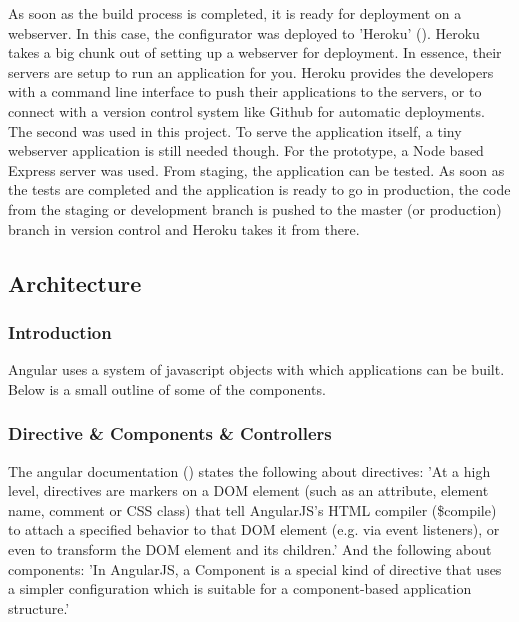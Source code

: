 As soon as the build process is completed, it is ready for deployment on a webserver. In this case, the configurator was deployed to 'Heroku' (\cite{heroku}). Heroku takes a big chunk out of setting up a webserver for deployment. In essence, their servers are setup to run an application for you. Heroku provides the developers with a command line interface to push their applications to the servers, or to connect with a version control system like Github for automatic deployments. The second was used in this project. To serve the application itself, a tiny webserver application is still needed though. For the prototype, a Node based Express server was used.\newline
From staging, the application can be tested. As soon as the tests are completed and the application is ready to go in production, the code from the staging or development branch is pushed to the master (or production) branch in version control and Heroku takes it from there.

\subsection{Architecture}
\subsubsection{Introduction}
Angular uses a system of javascript objects with which applications can be built. Below is a small outline of some of the components.\newline
\subsubsection{Directive \& Components \& Controllers}
The angular documentation (\cite{angularConcepts}) states the following about directives: \newline
'At a high level, directives are markers on a DOM element (such as an attribute, element name, comment or CSS class) that tell AngularJS's HTML compiler (\$compile) to attach a specified behavior to that DOM element (e.g. via event listeners), or even to transform the DOM element and its children.'\newline
And the following about components:\newline
'In AngularJS, a Component is a special kind of directive that uses a simpler configuration which is suitable for a component-based application structure.'\newline

